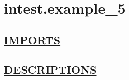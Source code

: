 \chapter*{intest.example\_5}
\hypertarget{ecldoc:toc:intest.example_5}{}

\section*{\underline{IMPORTS}}

\section*{\underline{DESCRIPTIONS}}
